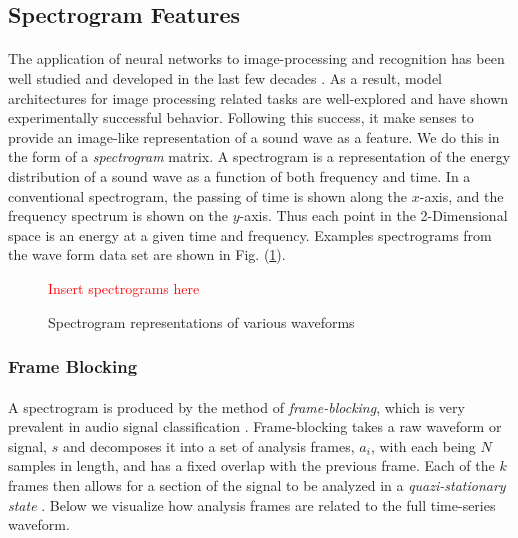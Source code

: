 \documentclass[12pt,letterpaper]{article}
\begin{document}

\newpage

\subsection{Spectrogram Features}
\label{subsec-Spectrogram}

\paragraph*{}The application of neural networks to image-processing and recognition has been well studied and developed in the last few decades \cite{Geron,Goodfellow,Loy,Mierswa}. As a result, model architectures for image processing related tasks are well-explored and have shown experimentally successful behavior. Following this success, it make senses to provide an image-like representation of a sound wave as a feature. We do this in the form of a \textit{spectrogram} matrix. A spectrogram is a representation of the energy distribution of a sound wave as a function of both frequency and time. In a conventional spectrogram, the passing of time is shown along the $x$-axis, and the frequency spectrum is shown on the $y$-axis. Thus each point in the 2-Dimensional space is an energy at a given time and frequency. Examples spectrograms from the wave form data set are shown in Fig. (\ref{fig-spectrograms}).
\begin{figure}[H]
\begin{center}
\textcolor{red}{Insert spectrograms here}
\caption{Spectrogram representations of various waveforms}
\label{fig-spectrograms}
\end{center}
\end{figure}


\subsubsection{Frame Blocking}
\label{subsubsec-FrameBlocking}

\paragraph*{}A spectrogram is produced by the method of \textit{frame-blocking}, which is very prevalent in audio signal classification \cite{Liu,Zhang}. Frame-blocking takes a raw waveform or signal, $s$ and decomposes it into a set of analysis frames, $a_i$, with each being $N$ samples in length, and has a fixed overlap with the previous frame. Each of the $k$ frames then allows for a section of the signal to be analyzed in a \textit{quazi-stationary state} \cite{Kahn,Serizel}. Below we visualize how analysis frames are related to the full time-series waveform. 
\end{document}
